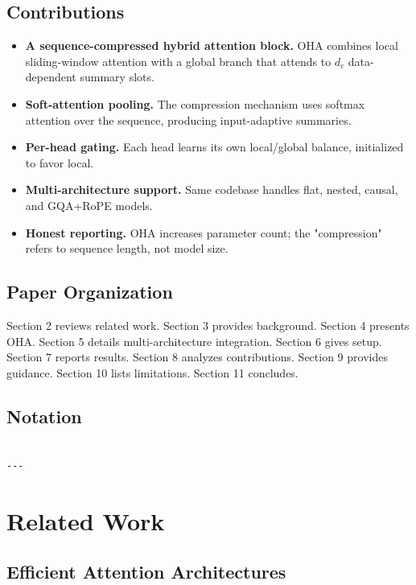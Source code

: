 \subsection{Contributions}

\begin{itemize}
\item \textbf{A sequence-compressed hybrid attention block.} OHA combines local
  sliding-window attention with a global branch that attends to $d_c$
  data-dependent summary slots.
\item \textbf{Soft-attention pooling.} The compression mechanism uses softmax
  attention over the sequence, producing input-adaptive summaries.
\item \textbf{Per-head gating.} Each head learns its own local/global balance,
  initialized to favor local.
\item \textbf{Multi-architecture support.} Same codebase handles flat, nested,
  causal, and GQA+RoPE models.
\item \textbf{Honest reporting.} OHA increases parameter count; the "compression"
  refers to sequence length, not model size.

\end{itemize}
\subsection{Paper Organization}

Section 2 reviews related work. Section 3 provides background. Section 4 
presents OHA. Section 5 details multi-architecture integration. Section 6 
gives setup. Section 7 reports results. Section 8 analyzes contributions. 
Section 9 provides guidance. Section 10 lists limitations. Section 11 
concludes.



\subsection{Notation}

\begin{lstlisting}

---
\end{lstlisting}


\section{Related Work}

\subsection{Efficient Attention Architectures}


